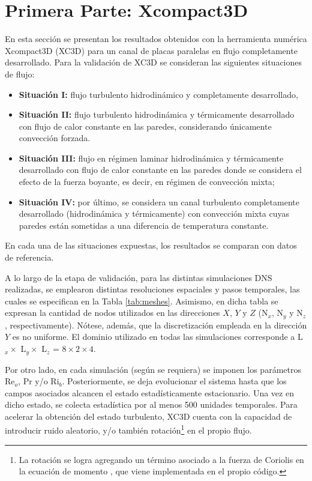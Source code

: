 \newpage
 
\section{Primera Parte: Xcompact3D}

En esta sección se presentan los resultados obtenidos con la herramienta numérica \linebreak Xcompact3D (XC3D) para un canal de placas paralelas en flujo completamente desarrollado. Para la validación de XC3D se consideran las siguientes situaciones de flujo: 

\begin{itemize}

\item \textbf{Situación I:} flujo turbulento hidrodinámico y completamente desarrollado,

\item \textbf{Situación II:} flujo turbulento hidrodinámica y térmicamente desarrollado con flujo de calor constante en las paredes, considerando únicamente convección forzada.

\item \textbf{Situación III:} flujo en régimen laminar hidrodinámica y térmicamente desarrollado con flujo de calor constante en las paredes donde se considera el efecto de la fuerza boyante, es decir, en régimen de convección mixta; 

\item \textbf{Situación IV:} por último, se considera un canal turbulento completamente desarrollado (hidrodinámica y térmicamente) con convección mixta cuyas paredes están sometidas a una diferencia de temperatura constante. 

\end{itemize}
En cada una de las situaciones expuestas, los resultados se comparan con datos de referencia.

A lo largo de la etapa de validación, para las distintas simulaciones DNS realizadas, se emplearon distintas resoluciones espaciales y pasos temporales, las cuales se especifican en la Tabla \ref{tab:meshes}. Asimismo, en dicha tabla se expresan la cantidad de nodos utilizados en las direcciones $X$, $Y$ y $Z$ (N$_x$, N$_y$ y N$_z$, respectivamente). Nótese, además, que la discretización empleada en la dirección $Y$ es no uniforme. El dominio utilizado en todas las simulaciones corresponde a L$_x \times$ L$_y \times$ L$_z$ = $8 \times 2 \times 4$.

Por otro lado, en cada simulación (según se requiera) se imponen los parámetros Re$_o$, Pr y/o Ri$_b$. Posteriormente, se deja evolucionar el sistema hasta que los campos asociados alcancen el estado estadísticamente estacionario. Una vez en dicho estado, se colecta estadística por al menos 500 unidades temporales. Para acelerar la obtención del estado turbulento, XC3D cuenta con la capacidad de introducir  ruido aleatorio, y/o también rotación\footnote{La rotación se logra agregando un término asociado a la fuerza de Coriolis en la ecuación de momento \cite{lamballais2014}, que viene implementada en el propio código.} en el propio flujo. 

